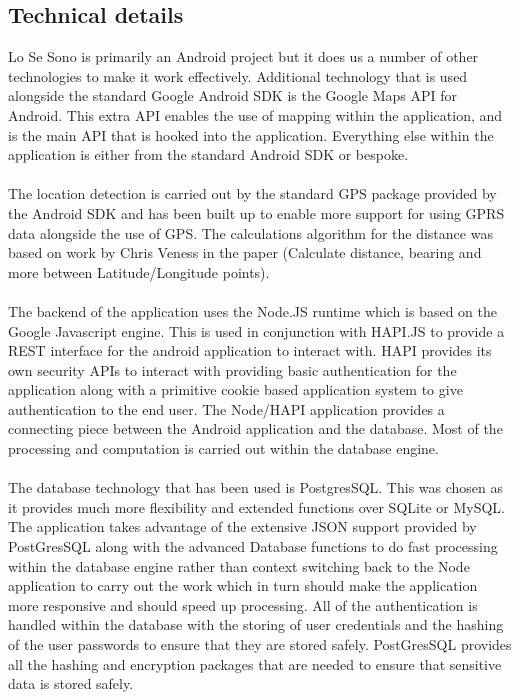 \documentclass[a0,landscape]{a0poster}
\begin{document}
\begin{multicols}{5}
\section{Technical details}

Lo Se Sono is primarily an Android project but it does us a number of other technologies to make it work effectively. Additional technology that is used alongside the standard Google Android SDK is the Google Maps API for Android. This extra API enables the use of mapping within the application, and is the main API that is hooked into the application. Everything else within the application is either from the standard Android SDK or bespoke.\\ 
\\
The location detection is carried out by the standard GPS package provided by the Android SDK and has been built up to enable more support for using GPRS data alongside the use of GPS. The calculations algorithm for the distance was based on work by Chris Veness in the paper (Calculate distance, bearing and more between Latitude/Longitude points).\\
\\
The backend of the application uses the Node.JS runtime which is based on the Google Javascript engine. This is used in conjunction with HAPI.JS to provide a REST interface for the android application to interact with. HAPI provides its own security APIs to interact with providing basic authentication for the application along with a primitive cookie based application system to give authentication to the end user. The Node/HAPI application provides a connecting piece between the Android application and the database. Most of the processing and computation is carried out within the database engine.\\
\\
The database technology that has been used is PostgresSQL. This was chosen as it provides much more flexibility and extended functions over SQLite or MySQL. The application takes advantage of the extensive JSON support provided by PostGresSQL along with the advanced Database functions to do fast processing within the database engine rather than context switching back to the Node application to carry out the work which in turn should make the application more responsive and should speed up processing. All of the authentication is handled within the database with the storing of user credentials and the hashing of the user passwords to ensure that they are stored safely. PostGresSQL provides all the hashing and encryption packages that are needed to ensure that sensitive data is stored safely.


\end{multicols}
\end{document}

